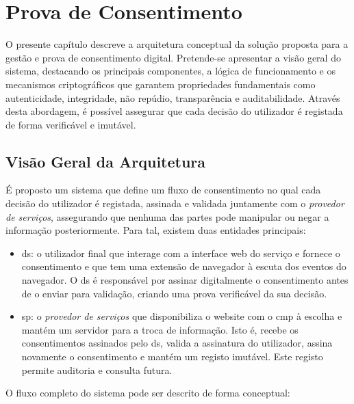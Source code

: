 \chapter{Prova de Consentimento}
\label{cap:arquitectura}

O presente capítulo descreve a arquitetura conceptual da solução proposta para a gestão e prova de consentimento digital. Pretende-se apresentar a visão geral do sistema, destacando os principais componentes, a lógica de funcionamento e os mecanismos criptográficos que garantem propriedades fundamentais como autenticidade, integridade, não repúdio, transparência e auditabilidade. Através desta abordagem, é possível assegurar que cada decisão do utilizador é registada de forma verificável e imutável.

\section{Visão Geral da Arquitetura}

É proposto um sistema que define um fluxo de consentimento no qual cada decisão do utilizador é registada, assinada e validada juntamente com o \textit{provedor de serviços}, assegurando que nenhuma das partes pode manipular ou negar a informação posteriormente. Para tal, existem duas entidades principais:

\begin{itemize}
    \item \acrfull{ds}: o utilizador final que interage com a interface web do serviço e fornece o consentimento e que tem uma extensão de navegador à escuta dos eventos do navegador. O \acrshort{ds} é responsável por assinar digitalmente o consentimento antes de o enviar para validação, criando uma prova verificável da sua decisão.
    \item \acrfull{sp}: o \textit{provedor de serviços} que disponibiliza o website com o \acrshort{cmp} à escolha e mantém um servidor para a troca de informação. Isto é, recebe os consentimentos assinados pelo \acrshort{ds}, valida a assinatura do utilizador, assina novamente o consentimento e mantém um registo imutável. Este registo permite auditoria e consulta futura.
\end{itemize}

O fluxo completo do sistema pode ser descrito de forma conceptual:

